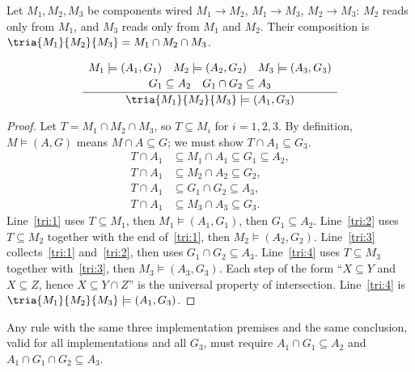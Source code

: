 
\begin{definition}[Triangle]
Let $M_1, M_2, M_3$ be components wired $M_1 \to M_2$, $M_1 \to M_3$, $M_2 \to M_3$: $M_2$ reads only from $M_1$, and $M_3$ reads only from $M_1$ and $M_2$. Their composition is $\tria{M_1}{M_2}{M_3} = M_1 \cap M_2 \cap M_3$.
\end{definition}

\begin{theorem}
\[
\frac{
  \begin{array}{c}
M_1\models(A_1,G_1)\quad M_2\models(A_2,G_2)\quad M_3\models(A_3,G_3)\\[2pt] G_1\subseteq A_2\quad G_1\cap G_2\subseteq A_3
  \end{array}
}{\tria{M_1}{M_2}{M_3}\models(A_1,G_3)}
\]
\end{theorem}

\begin{proof}
Let $T = M_1 \cap M_2 \cap M_3$, so $T \subseteq M_i$ for $i = 1, 2, 3$. By definition, $M \models (A, G)$ means $M \cap A \subseteq G$; we must show $T \cap A_1 \subseteq G_3$.
\begin{align}
T \cap A_1 &\subseteq M_1 \cap A_1 \subseteq G_1 \subseteq A_2, \label{tri:1}\\ T \cap A_1 &\subseteq M_2 \cap A_2 \subseteq G_2, \label{tri:2}\\ T \cap A_1 &\subseteq G_1 \cap G_2 \subseteq A_3, \label{tri:3}\\ T \cap A_1 &\subseteq M_3 \cap A_3 \subseteq G_3. \label{tri:4}
\end{align}
Line~\eqref{tri:1} uses $T \subseteq M_1$, then $M_1 \models (A_1, G_1)$, then $G_1 \subseteq A_2$. Line~\eqref{tri:2} uses $T \subseteq M_2$ together with the end of~\eqref{tri:1}, then $M_2 \models (A_2, G_2)$. Line~\eqref{tri:3} collects~\eqref{tri:1} and~\eqref{tri:2}, then uses $G_1 \cap G_2 \subseteq A_3$. Line~\eqref{tri:4} uses $T \subseteq M_3$ together with~\eqref{tri:3}, then $M_3 \models (A_3, G_3)$. Each step of the form ``$X \subseteq Y$ and $X \subseteq Z$, hence $X \subseteq Y \cap Z$'' is the universal property of intersection. Line~\eqref{tri:4} is $\tria{M_1}{M_2}{M_3} \models (A_1, G_3)$.
\end{proof}

\begin{proposition}
Any rule with the same three implementation premises and the same conclusion, valid for all implementations and all $G_3$, must require $A_1 \cap G_1 \subseteq A_2$ and $A_1 \cap G_1 \cap G_2 \subseteq A_3$.
\end{proposition}

